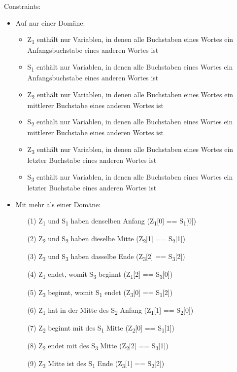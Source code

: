 \documentclass[ngerman]{fbi-aufgabenblatt}
\begin{document}
Constraints: 
\begin{itemize}
	\item Auf nur einer Domäne: 
	\begin{itemize}
		\item Z\textsubscript{1} enthält nur Variablen, in denen alle Buchstaben eines Wortes ein Anfangsbuchstabe eines anderen Wortes ist 
		\item S\textsubscript{1} enthält nur Variablen, in denen alle Buchstaben eines Wortes ein Anfangsbuchstabe eines anderen Wortes ist  
		\item Z\textsubscript{2} enthält nur Variablen, in denen alle Buchstaben eines Wortes ein mittlerer Buchstabe eines anderen Wortes ist 
		\item S\textsubscript{2} enthält nur Variablen, in denen alle Buchstaben eines Wortes ein mittlerer Buchstabe eines anderen Wortes ist
		\item Z\textsubscript{3} enthält nur Variablen, in denen alle Buchstaben eines Wortes ein letzter Buchstabe eines anderen Wortes ist 
		\item S\textsubscript{3} enthält nur Variablen, in denen alle Buchstaben eines Wortes ein letzter Buchstabe eines anderen Wortes ist 
	\end{itemize}

	\item Mit mehr als einer Domäne: 
	\begin{itemize}
		\item[(1)] Z\textsubscript{1} und S\textsubscript{1} haben denselben Anfang (Z\textsubscript{1}[0] == S\textsubscript{1}[0])
		\item[(2)] Z\textsubscript{2} und S\textsubscript{2} haben dieselbe Mitte (Z\textsubscript{2}[1] == S\textsubscript{2}[1])
		\item[(3)] Z\textsubscript{3} und S\textsubscript{3} haben dasselbe Ende (Z\textsubscript{3}[2] == S\textsubscript{3}[2])
		\item[(4)] Z\textsubscript{1} endet, womit S\textsubscript{3} beginnt (Z\textsubscript{1}[2] == S\textsubscript{3}[0])
		\item[(5)] Z\textsubscript{3} beginnt, womit S\textsubscript{1} endet (Z\textsubscript{3}[0] == S\textsubscript{1}[2])
		\item[(6)] Z\textsubscript{1} hat in der Mitte des S\textsubscript{2} Anfang (Z\textsubscript{1}[1] == S\textsubscript{2}[0])
		\item[(7)] Z\textsubscript{2} beginnt mit des S\textsubscript{1} Mitte (Z\textsubscript{2}[0] == S\textsubscript{1}[1])
		\item[(8)] Z\textsubscript{2} endet mit des S\textsubscript{3} Mitte (Z\textsubscript{2}[2] == S\textsubscript{3}[1])
		\item[(9)] Z\textsubscript{3} Mitte ist des S\textsubscript{1} Ende (Z\textsubscript{3}[1] == S\textsubscript{2}[2]) \\
	\end{itemize}
\end{itemize} 
\end{document}
